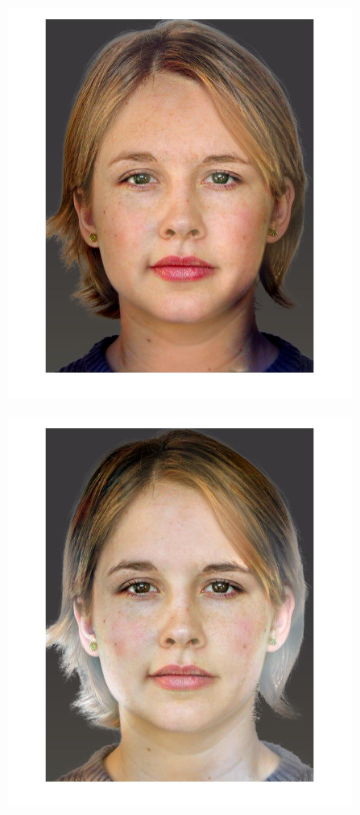 \documentclass[a4paper]{iacas}
\begin{document}
\begin{figure}[!htbp]
\begin{subfigure}[b]{0.32\textwidth}
		\includegraphics[width=\textwidth]{image_46_16.jpg}
		\caption{}
		\label{fig:i_46_16}
	\end{subfigure}
	\begin{subfigure}[b]{0.32\textwidth}
		\includegraphics[width=\textwidth]{image_46_21.jpg}
		\caption{}
		\label{fig:i_46_21}
	\end{subfigure}
	

\end{figure}
\end{document}
